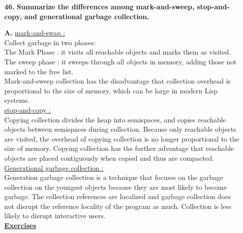 \documentclass[letterpaper]{article}
\begin{document}
\begin{large}
\begin{flushleft}
\begin{enumerate}
\item[\textbf{46.}]
\textbf{Summarize the differences among mark-and-sweep, stop-and-copy, and generational garbage collection.}
\item[\textbf{A.}]
\underline{mark-and-swap :}\\
Collect garbage in two phases: \\
The Mark Phase : it visits all reachable objects and marks them as visited.\\ The sweep phase :  it sweeps through all objects in memory, adding those not marked to the free list.\\
Mark-and-sweep collection has the disadvantage that collection overhead is proportional to the size of memory, which can be large in modern Lisp systems.\\ 
\underline{stop-and-copy :}\\
Copying collection divides the heap into semispaces, and copies reachable objects between semispaces during collection. Because only reachable objects are visited, the overhead of copying collection is no longer proportional to the size of memory. Copying collection has the further advantage that reachable objects are placed contiguously when copied and thus are compacted.\\ 
\underline{Generational garbage collection :}\\
Generation garbage collection is a technique that focuses on the garbage collection on the youngest objects because they are most likely to become garbage. 
The collection references are localized and garbage collection
does not disrupt the reference locality of the program as
much. Collection is less likely to disrupt interactive users.\\[0.2in] 

\textbf{\underline{Exercises }}\\[0.2in]


\end{enumerate}
\end{flushleft}
\end{large}
\end{document}
